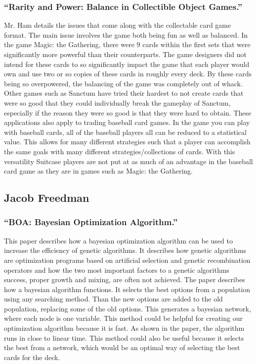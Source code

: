 \documentclass[12pt, letterpaper]{article}
\begin{document}
\subsubsection{\enquote{Rarity and Power: Balance in Collectible Object Games.}}

Mr. Ham details the issues that come along with the collectable card game format. The main issue involves the game both
being fun as well as balanced. In the game Magic: the Gathering, there were 9 cards within the first sets that were
significantly more powerful than their counterparts. The game designers did not intend for these cards to so
significantly impact the game that each player would own and use two or so copies of these cards in roughly every deck.
By these cards being so overpowered, the balancing of the game was completely out of whack. Other games such as Sanctum
have tried their hardest to not create cards that were so good that they could individually break the gameplay of
Sanctum, especially if the reason they were so good is that they were hard to obtain. These applications also apply to
trading baseball card games. In the game you can play with baseball cards, all of the baseball players all can be
reduced to a statistical value. This allows for many different strategies such that a player can accomplish the same
goals with many different strategies/collections of cards. With this versatility Suitcase players are not put at as much
of an advantage in the baseball card game as they are in games such as Magic: the Gathering.

\subsection{Jacob Freedman}

\subsubsection{\enquote{BOA: Bayesian Optimization Algorithm.}}

This paper describes how a bayesian optimization algorithm can be used to increase the efficiency of genetic algorithms.
It describes how genetic algorithms are optimization programs based on artificial selection and genetic recombination
operators and how the two most important factors to a genetic algorithms success, proper growth and mixing, are often
not achieved. The paper describes how a bayesian algorithm functions. It selects the best options from a population
using any searching method. Than the new options are added to the old population, replacing some of the old options.
This generates a bayesian network, where each node is one variable. This method could be helpful for creating our
optimization algorithm because it is fast. As shown in the paper, the algorithm runs in close to linear time. This
method could also be useful because it selects the best from a network, which would be an optimal way of selecting the
best cards for the deck.
\end{document}
